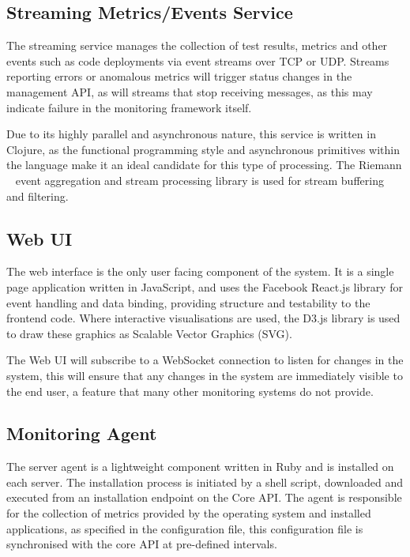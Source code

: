 \documentclass{cshonours}
\begin{document}
\subsection{Streaming Metrics/Events Service}

The streaming service manages the collection of test results, metrics and other events such as code deployments via event streams over TCP or UDP. Streams reporting errors or anomalous metrics will trigger status changes in the management API, as will streams that stop receiving messages, as this may indicate failure in the monitoring framework itself.

Due to its highly parallel and asynchronous nature, this service is written in
Clojure, as the functional programming style and asynchronous primitives within
the language make it an ideal candidate for this type of processing. The Riemann
~\cite{Riemann} event aggregation and stream processing library is used for stream buffering and filtering.

\subsection{Web UI}

The web interface is the only user facing component of the system. It is a single page application written in JavaScript, and uses the Facebook React.js library for event handling and data binding, providing structure and testability to the frontend code. Where interactive visualisations are used, the D3.js library is used to draw these graphics as Scalable Vector Graphics (SVG).

The Web UI will subscribe to a WebSocket connection to listen for changes in the system, this will ensure that any changes in the system are immediately visible to the end user, a feature that many other monitoring systems do not provide.

\subsection{Monitoring Agent}

The server agent is a lightweight component written in Ruby and is installed on each server. The installation process is initiated by a shell script, downloaded and executed from an installation endpoint on the Core API. The agent is responsible for the collection of metrics provided by the operating system and installed applications, as specified in the configuration file, this configuration file is synchronised with the core API at pre-defined intervals.
\end{document}
